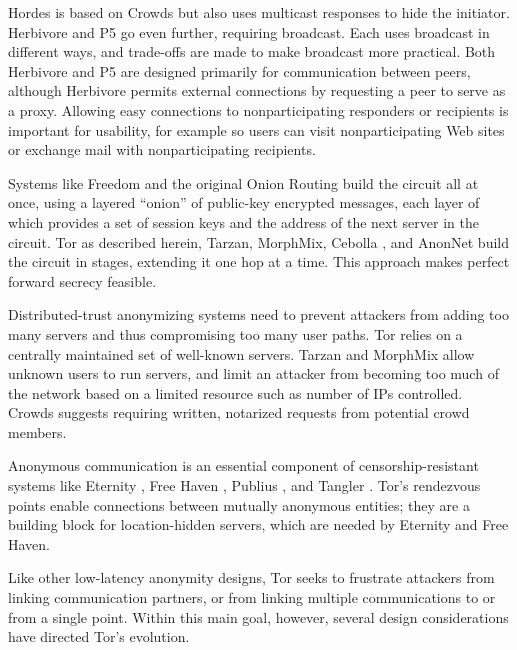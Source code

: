 \documentclass[times,10pt,twocolumn]{article}
\begin{document}
Hordes \cite{hordes-jcs} is based on Crowds but also uses multicast
responses to hide the initiator. Herbivore \cite{herbivore} and P5
\cite{p5} go even further, requiring broadcast.  Each uses broadcast
in different ways, and trade-offs are made to make broadcast more
practical. Both Herbivore and P5 are designed primarily for communication
between peers, although Herbivore permits external connections by
requesting a peer to serve as a proxy.  Allowing easy connections to
nonparticipating responders or recipients is important for usability,
for example so users can visit nonparticipating Web sites or exchange
mail with nonparticipating recipients.

Systems like Freedom and the original Onion Routing build the circuit
all at once, using a layered ``onion'' of public-key encrypted messages,
each layer of which provides a set of session keys and the address of the
next server in the circuit. Tor as described herein, Tarzan, MorphMix,
Cebolla \cite{cebolla}, and AnonNet \cite{anonnet} build the circuit
in stages, extending it one hop at a time. This approach makes perfect
forward secrecy feasible.

Distributed-trust anonymizing systems need to prevent attackers from
adding too many servers and thus compromising too many user paths.
Tor relies on a centrally maintained set of well-known servers. Tarzan
and MorphMix allow unknown users to run servers, and limit an attacker
from becoming too much of the network based on a limited resource such
as number of IPs controlled. Crowds suggests requiring written, notarized
requests from potential crowd members.

Anonymous communication is an essential component of censorship-resistant
systems like Eternity \cite{eternity}, Free Haven \cite{freehaven-berk},
Publius \cite{publius}, and Tangler \cite{tangler}. Tor's rendezvous
points enable connections between mutually anonymous entities; they
are a building block for location-hidden servers, which are needed by
Eternity and Free Haven.


\label{sec:assumptions}

Like other low-latency anonymity designs, Tor seeks to frustrate
attackers from linking communication partners, or from linking
multiple communications to or from a single point.  Within this
main goal, however, several design considerations have directed
Tor's evolution.
\end{document}
